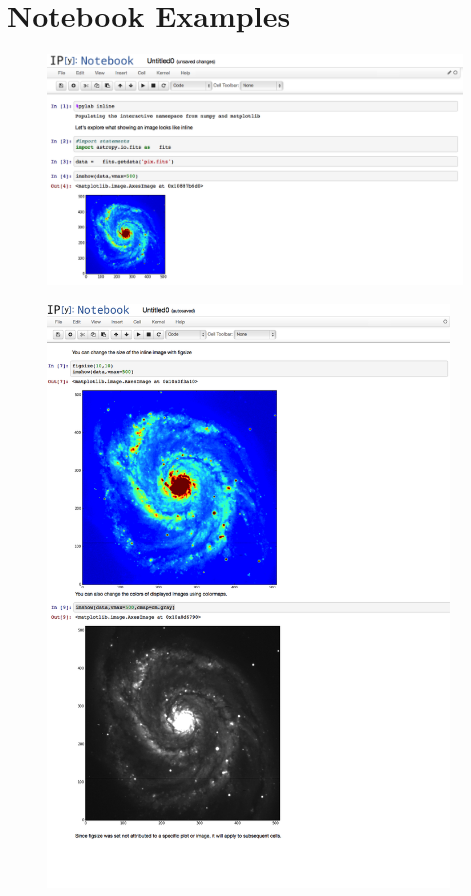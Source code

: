 \section{Notebook Examples}

\begin{figure}[H]
  \centering
    \includegraphics[width=0.98\textwidth]{notebook1.png}
\end{figure}

\newpage
\begin{figure}[H]
  \centering
    \includegraphics[width=0.95\textwidth]{notebook2.png}
\end{figure}

